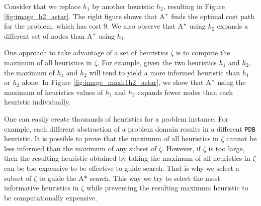 Consider that we replace $h_{1}$ by another heuristic $h_2$, resulting in Figure \ref{fig:image_h2_astar}. The right figure shows that A$\sp{*}$ finds the optimal cost path for the problem, which has cost 9. We also observe that A$\sp{*}$ using $h_2$ expands a different set of nodes than A$\sp{*}$ using $h_1$.

One approach to take advantage of a set of heuristics $\zeta$ is to compute the maximum of all heuristics in $\zeta$. For example, given the two heuristics $h_1$ and $h_2$, the maximum of $h_1$ and $h_2$ will tend to yield a more informed heuristic than $h_1$ or $h_2$ alone. In Figure \ref{fig:image_maxh1h2_astar}, we show that A$\sp{*}$ using the maximum of heuristics values of $h_{1}$ and $h_{2}$ expands fewer nodes than each heuristic individually.

One can easily create thousands of heuristics for a problem instance. For example, each different abstraction of a problem domain results in a different \texttt{PDB} heuristic. It is possible to prove that the maximum of all heuristics in $\zeta$ cannot be less informed than the maximum of any subset of $\zeta$. However, if $\zeta$ is too large, then the resulting heuristic obtained by taking the maximum of all heuristics in $\zeta$ can be too expensive to be effective to guide search. That is why we select a subset of $\zeta$ to guide the A* search. This way we try to select the most informative heuristics in $\zeta$ while preventing the resulting maximum heuristic to be computationally expensive. 




